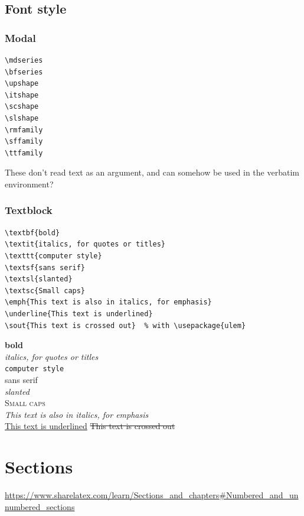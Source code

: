 \documentclass{article}
\begin{document}
\subsection{Font style}
\subsubsection{Modal}
\begin{minipage}[t]{0.5\textwidth}
\begin{verbatim}
\mdseries
\bfseries
\upshape
\itshape
\scshape
\slshape
\rmfamily
\sffamily
\ttfamily
\end{verbatim}
\end{minipage}
\begin{minipage}[t]{0.5\textwidth}
    These don't read text as an argument, and can somehow be
    used in the verbatim environment?
\end{minipage}

\subsubsection{Textblock}
\begin{minipage}[t]{0.5\textwidth}
\begin{lstlisting}
\textbf{bold}
\textit{italics, for quotes or titles}
\texttt{computer style}
\textsf{sans serif}
\textsl{slanted}
\textsc{Small caps}
\emph{This text is also in italics, for emphasis}
\underline{This text is underlined}
\sout{This text is crossed out}  % with \usepackage{ulem}
\end{lstlisting}
\end{minipage}
\begin{minipage}[t]{0.5\textwidth}
\textbf{bold}\\
\textit{italics, for quotes or titles}\\
\texttt{computer style}\\
\textsf{sans serif}\\
\textsl{slanted}\\
\textsc{Small caps}\\
\emph{This text is also in italics, for emphasis}\\
\underline{This text is underlined}
\sout{This text is crossed out}
\end{minipage}

\newpage
\section{Sections}
\begin{minipage}{\textwidth}
\url{https://www.sharelatex.com/learn/Sections_and_chapters#Numbered_and_unnumbered_sections}
\end{minipage}
\end{document}
